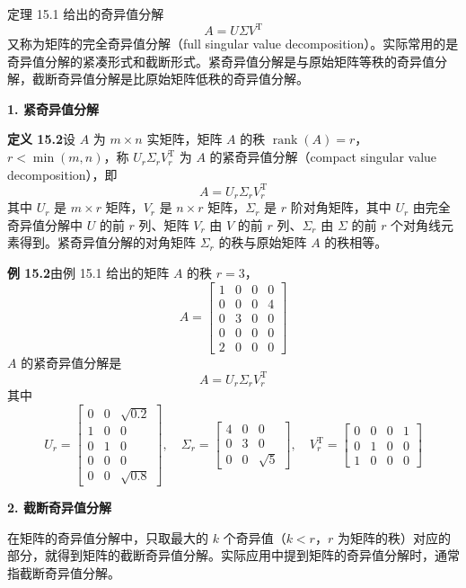 \documentclass[UTF8, 12pt, fontset=fandol, oneside]{ctexart}
\begin{document}
定理 15.1 给出的奇异值分解
\[
A=U\Sigma V^{\mathrm{T}}
\]
又称为矩阵的完全奇异值分解（full singular value decomposition）。实际常用的是奇异值分解的紧凑形式和截断形式。紧奇异值分解是与原始矩阵等秩的奇异值分解，截断奇异值分解是比原始矩阵低秩的奇异值分解。

\noindent\textbf{1. 紧奇异值分解}

\noindent\textbf{定义 15.2}\quad 设 $A$ 为 $m\times n$ 实矩阵，矩阵 $A$ 的秩 $\operatorname{rank}(A)=r$，$r<\min(m,n)$，称 $U_r\Sigma_rV_r^{\mathrm{T}}$ 为 $A$ 的紧奇异值分解（compact singular value decomposition），即
\begin{equation}
A=U_r\Sigma_rV_r^{\mathrm{T}}
\tag{15.18}
\end{equation}
其中 $U_r$ 是 $m\times r$ 矩阵，$V_r$ 是 $n\times r$ 矩阵，$\Sigma_r$ 是 $r$ 阶对角矩阵，其中 $U_r$ 由完全奇异值分解中 $U$ 的前 $r$ 列、矩阵 $V_r$ 由 $V$ 的前 $r$ 列、$\Sigma_r$ 由 $\Sigma$ 的前 $r$ 个对角线元素得到。紧奇异值分解的对角矩阵 $\Sigma_r$ 的秩与原始矩阵 $A$ 的秩相等。

\noindent\textbf{例 15.2}\quad 由例 15.1 给出的矩阵 $A$ 的秩 $r=3$，
\[
A=
\begin{bmatrix}
1&0&0&0\\
0&0&0&4\\
0&3&0&0\\
0&0&0&0\\
2&0&0&0
\end{bmatrix}
\]
$A$ 的紧奇异值分解是
\[
A=U_r\Sigma_rV_r^{\mathrm{T}}
\]
其中
\[
U_r=
\begin{bmatrix}
0&0&\sqrt{0.2}\\
1&0&0\\
0&1&0\\
0&0&0\\
0&0&\sqrt{0.8}
\end{bmatrix},
\quad
\Sigma_r=
\begin{bmatrix}
4&0&0\\
0&3&0\\
0&0&\sqrt5
\end{bmatrix},
\quad
V_r^{\mathrm{T}}=
\begin{bmatrix}
0&0&0&1\\
0&1&0&0\\
1&0&0&0
\end{bmatrix}
\]

\noindent\textbf{2. 截断奇异值分解}

在矩阵的奇异值分解中，只取最大的 $k$ 个奇异值（$k<r$，$r$ 为矩阵的秩）对应的部分，就得到矩阵的截断奇异值分解。实际应用中提到矩阵的奇异值分解时，通常指截断奇异值分解。
\end{document}
